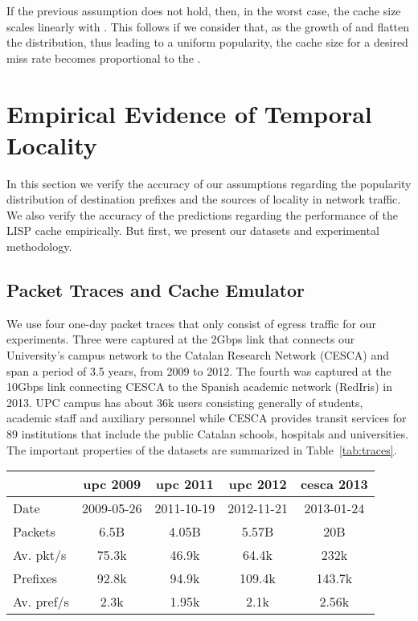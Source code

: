 \documentclass[twocolumn, 10pt]{article}
\theoremstyle{plain}
\begin{document}
If the previous assumption does not hold, then, in the worst case, the cache
size scales linearly with . This follows if we consider that, as the
growth of  and  flatten the distribution, thus leading to a uniform
popularity, the cache size for a desired miss rate becomes proportional to the
. 


  
\section{Empirical Evidence of Temporal Locality}\label{sec:evaluation}
In this section we verify the accuracy of our assumptions regarding the
popularity distribution of destination prefixes and the sources of locality in
network traffic. We also verify the accuracy of the predictions regarding the
performance of the LISP cache empirically. But first, we present our datasets
and experimental methodology.

\subsection{Packet Traces and Cache Emulator}

We use four one-day packet traces that only consist of egress traffic for our
experiments. Three were captured at the 2Gbps link that connects our
University's campus network to the Catalan Research Network (CESCA) and span a
period of 3.5 years, from 2009 to 2012. The fourth was captured at the 10Gbps
link connecting CESCA to the Spanish academic network (RedIris) in 2013. UPC
campus has about 36k users consisting generally of students, academic staff
and auxiliary personnel while CESCA provides transit services for 89
institutions that include the public Catalan schools, hospitals and
universities. 
The important properties of the datasets are summarized in
Table~\ref{tab:traces}. 


\begin{table*}[t]
    \centering
    \caption{Datasets Statistics}
    \label{tab:traces}
    \begin{tabular}{lcccc}
        \toprule
                & \textbf{upc 2009} & \textbf{upc 2011} & \textbf{upc 2012} & \textbf{cesca 2013} \\ \midrule[0.09em]
        Date    & 2009-05-26 & 2011-10-19 & 2012-11-21 & 2013-01-24\\ \midrule 
        Packets & 6.5B & 4.05B & 5.57B & 20B \\ \midrule
        Av. pkt/s & 75.3k & 46.9k & 64.4k & 232k  \\ \midrule
        Prefixes  & 92.8k & 94.9k & 109.4k & 143.7k \\ \midrule
        Av. pref/s & 2.3k & 1.95k & 2.1k & 2.56k \\         
        \bottomrule
    \end{tabular}
\end{table*}
\end{document}
